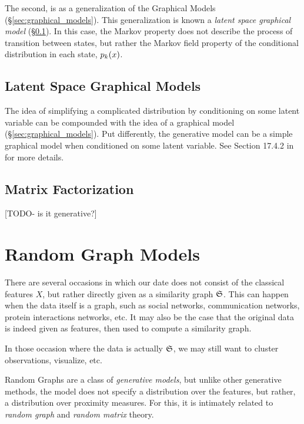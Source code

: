 The second, is as a generalization of the Graphical Models (\S\ref{sec:graphical_models}). 
This generalization is known a \emph{latent space graphical model} (\S\ref{sec:latent_graphical}). 
In this case, the Markov property does not describe the process of transition between states, but rather the Markov field property of the conditional distribution in each state, $p_k(x)$. 




\subsection{Latent Space Graphical Models}
\label{sec:latent_graphical}

The idea of simplifying a complicated distribution by conditioning on some latent variable can be compounded with the idea of a graphical model (\S\ref{sec:graphical_models}). 
Put differently, the generative model can be a simple graphical model when conditioned on some latent variable.
See Section 17.4.2 in \cite{hastie_elements_2003} for more details.





\subsection{Matrix Factorization}
\label{sec:matrix_factorization}
[TODO- is it generative?]




\section{Random Graph Models}
\label{sec:random_graphs}

There are several occasions in which our date does not consist of the classical features $X$, but rather directly given as a similarity graph $\mathfrak{S}$. This can happen when the data itself is a graph, such as social networks, communication networks, protein interactions networks, etc. 
It may also be the case that the original data is indeed given as features, then used to compute a similarity graph. 

In those occasion where the data is actually $\mathfrak{S}$, we may still want to cluster observations, visualize, etc.

Random Graphs are a class of \emph{generative models}, but unlike other generative methods, the model does not specify a distribution over the features, but rather, a distribution over proximity measures.
For this, it is  intimately related to \emph{random graph} and \emph{random matrix} theory.

